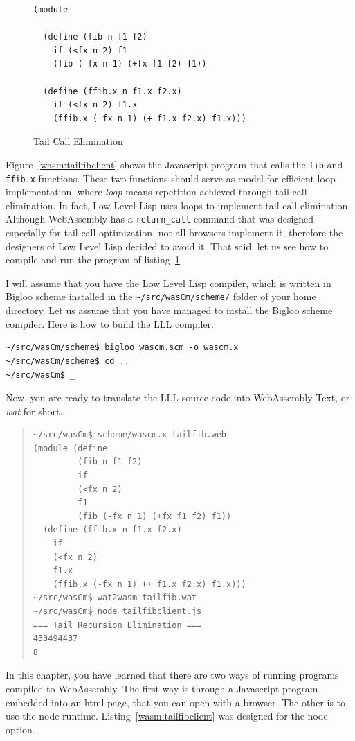 \documentclass[a4paper,12pt]{book}
\begin{document}
\begin{figure}[!h]
\begin{verbatim}
(module

  (define (fib n f1 f2)
    if (<fx n 2) f1
    (fib (-fx n 1) (+fx f1 f2) f1))

  (define (ffib.x n f1.x f2.x)
    if (<fx n 2) f1.x
    (ffib.x (-fx n 1) (+ f1.x f2.x) f1.x)))
\end{verbatim}
  \caption{Tail Call Elimination}
  \label{wasm:tailcall}
\end{figure}

Figure~\ref{wasm:tailfibclient} shows the Javascript
program that calls the \verb|fib| and \verb|ffib.x|
functions. These two functions should serve as model
for efficient loop implementation, where {\em loop}
means repetition achieved through tail call elimination.
In fact, Low Level Lisp uses loops to implement tail
call elimination. Although WebAssembly has
a \verb|return_call| command that was designed especially
for tail call optimization, not all browsers implement
it, therefore the designers of Low Level Lisp decided
to avoid it. That said, let us see how to compile and
run the program of listing~\ref{wasm:tailcall}.

I will assume that you have the Low Level Lisp compiler,
which is written in Bigloo scheme installed in the
\verb|~/src/wasCm/scheme/| folder of your home directory.
Let us assume that you have managed to install the
Bigloo scheme compiler. Here is how to build the
LLL compiler:
\begin{verbatim}
~/src/wasCm/scheme$ bigloo wascm.scm -o wascm.x
~/src/wasCm/scheme$ cd ..
~/src/wasCm$ _
\end{verbatim}

Now, you are ready to translate the LLL source code into
WebAssembly Text, or {\em wat} for short.
\begin{quote}
  \begin{verbatim}
~/src/wasCm$ scheme/wascm.x tailfib.web
(module (define
         (fib n f1 f2)
         if
         (<fx n 2)
         f1
         (fib (-fx n 1) (+fx f1 f2) f1))
  (define (ffib.x n f1.x f2.x)
    if
    (<fx n 2)
    f1.x
    (ffib.x (-fx n 1) (+ f1.x f2.x) f1.x)))
~/src/wasCm$ wat2wasm tailfib.wat
~/src/wasCm$ node tailfibclient.js
=== Tail Recursion Elimination ===
433494437
8

\end{verbatim}
\end{quote}
In this chapter, you have learned that there are two
ways of running programs compiled to WebAssembly.
The first way is through a Javascript program embedded
into an html page, that you can open with a browser.
The other is to use the node runtime.
Listing~\ref{wasm:tailfibclient} was designed for the
node option.
\end{document}
